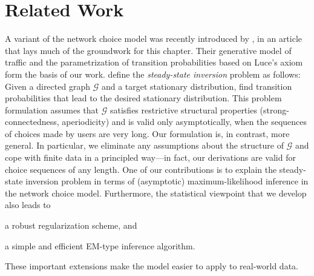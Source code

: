 \section{Related Work}  %
\label{cr:sec:relwork}

A variant of the network choice model was recently introduced by \citet{kumar2015inverting}, in an article that lays much of the groundwork for this chapter.
Their generative model of traffic and the parametrization of transition probabilities based on Luce's axiom form the basis of our work.
\citeauthor{kumar2015inverting} define the \emph{steady-state inversion} problem as follows:
Given a directed graph $\mathcal{G}$ and a target stationary distribution, find transition probabilities that lead to the desired stationary distribution.
This problem formulation assumes that $\mathcal{G}$ satisfies restrictive structural properties (strong-connectedness, aperiodicity) and is valid only asymptotically, when the sequences of choices made by users are very long.
Our formulation is, in contrast, more general.
In particular, we eliminate any assumptions about the structure of $\mathcal{G}$ and cope with finite data in a principled way---in fact, our derivations are valid for choice sequences of any length.
One of our contributions is to explain the steady-state inversion problem in terms of (asymptotic) maximum-likelihood inference in the network choice model.
Furthermore, the statistical viewpoint that we develop also leads to
\begin{enuminline}
\item a robust regularization scheme, and
\item a simple and efficient EM-type inference algorithm.
\end{enuminline}
These important extensions make the model easier to apply to real-world data.

